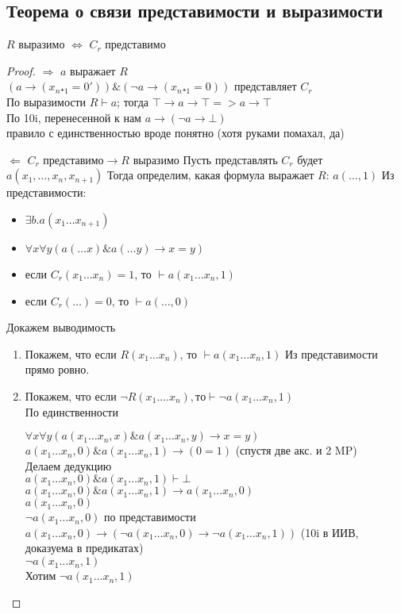 \subsection{Теорема о связи представимости и выразимости}
\label{sec-11-2}
\begin{theorem}
$R$ выразимо $\Leftrightarrow$ $C_r$ представимо
\end{theorem}
\begin{proof}
$\Rightarrow$ $a$ выражает $R$\\
$(a \to (x_n₊_1=0')) \& (\lnot a \to (x_n₊_1=0))$
представляет $C_r$\\
По выразимости $R \vdash a$; тогда $\top\to a\to \top => a\to \top$\\
По 10i, перенесенной к нам $a \to (\lnot a \to \bot)$\\
правило с единственностью вроде понятно (хотя руками помахал, да)

$\Leftarrow$ $C_r \text{ представимо} \to R \text{ выразимо}$
Пусть представлять $C_r$ будет
$a(x_1, \dotsc, x_n,x_{n+1})$
Тогда определим, какая формула выражает $R$:
$a(\dotsc, 1)$
Из представимости:
\begin{itemize}
\item $\exists b.a(x_1\dots x_{n+1})$
\item $\forall x\forall y(a(\dots x) \& a(\dots  y) \to x = y)$
\item если $C_r(x_1\dots x_n) = 1$, то $\vdash a(x_1\dots x_n,1)$
\item если $C_r(\dots) = 0$, то $\vdash a(\dotsc, 0)$
\end{itemize}
Докажем выводимость
\begin{enumerate}
\item Покажем, что если $R(x_1\dots x_n)$, то $\vdash a(x_1\dots x_n, 1)$
Из представимости прямо ровно.
\item Покажем, что если $\lnot R(x_1\dots .x_n), то \vdash \lnot a(x_1\dots x_n, 1)$\\
По единственности

$\forall x\forall y(a(x_1\dots x_n, x) \& a(x_1\dots x_n, y) \to x = y)$\\
$a(x_1\dots x_n, 0) \& a(x_1\dots x_n, 1) \to (0 = 1)$ (спустя две акс. и 2 MP)\\
Делаем дедукцию\\
$a(x_1\dots x_n, 0) \& a(x_1\dots x_n, 1) \vdash \bot$\\
$a(x_1\dots x_n, 0) \& a(x_1\dots x_n, 1) \to a(x_1\dots x_n, 0)$\\
$a(x_1\dots x_n, 0)$\\
$\lnot a(x_1\dots x_n, 0)$ по представимости
$a(x_1\dots x_n, 0) \to (\lnot a(x_1\dots x_n, 0) \to \lnot a(x_1\dots x_n, 1))$ (10i в ИИВ, доказуема в предикатах)\\
$\lnot a(x_1\dots x_n, 1)$\\
Хотим $\lnot a(x_1\dots x_n, 1)$
\end{enumerate}
\end{proof}
